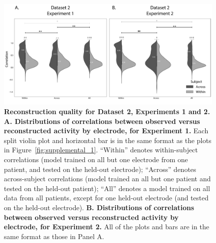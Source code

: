 \documentclass[10pt]{article}
\begin{document}
\begin{figure}[p]
\centering
\includegraphics[width=\textwidth]{figs/supplemental_2}
\caption{\textbf{Reconstruction quality for Dataset 2,
    Experiments 1 and 2.} \textbf{A. Distributions of correlations
    between observed versus reconstructed activity by electrode, for
    Experiment 1.}  Each split violin plot and horizontal bar is in
  the same format as the plots in Figure~\ref{fig:supplemental_1}.
  ``Within'' denotes within-subject correlations (model trained on all
  but one electrode from one patient, and tested on the held-out
  electrode); ``Across'' denotes across-subject correlations (model
  trained an all but one patient and tested on the held-out patient);
  ``All'' denotes a model trained on all data from all patients,
  except for one held-out electrode (and tested on the held-out
  electrode).  \textbf{B. Distributions of correlations between
    observed versus reconstructed activity by electrode, for
    Experiment 2.}  All of the plots and bars are in the same format
  as those in Panel A.}
\label{fig:supplemental_2}
\end{figure}
\end{document}
